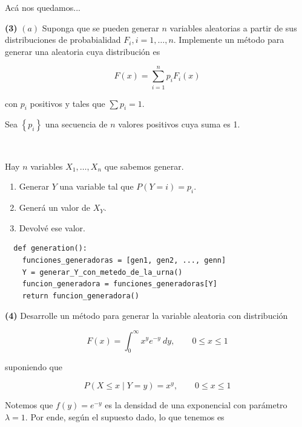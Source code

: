 \documentclass[a4paper, 12pt]{article}
\begin{document}
Acá nos quedamos...

\pagebreal 

\begin{myframe}
  \textbf{(3)} $(a)$ Suponga que se pueden generar $n$ variables aleatorias a
  partir de sus distribuciones de probabialidad $F_i, i=1, \ldots, n$.
  Implemente un método para generar una aleatoria cuya distribución es 

  \begin{equation*}
    F(x) = \sum_{i=1}^n p_iF_i(x)
  \end{equation*}

  con $p_i$ positivos y tales que $\sum p_i = 1$.
\end{myframe}

Sea $\left\{ p_i \right\} $ una secuencia de $n$ valores positivos cuya suma es
1. 

~

Hay $n$ variables $X_1, \ldots, X_n$ que sabemos generar. 

\begin{enumerate}
  \item Generar $Y$ una variable tal que $P(Y = i) = p_i$.
  \item Generá un valor de $X_Y$.
  \item Devolvé ese valor.
\end{enumerate}

\begin{verbatim}
  def generation():
    funciones_generadoras = [gen1, gen2, ..., genn]
    Y = generar_Y_con_metedo_de_la_urna()
    funcion_generadora = funciones_generadoras[Y]
    return funcion_generadora()
\end{verbatim}

\pagebreak 

\begin{myframe}
  \textbf{(4)} Desarrolle un método para generar la variable aleatoria con
  distribución 

  \begin{equation*}
    F(x) = \int_0^\infty x^ye^{-y} ~ dy, \qquad 0\leq x \leq 1
  \end{equation*}

  suponiendo que 

  \begin{equation*}
    P(X \leq x \mid Y = y) = x^y, \qquad 0 \leq x \leq 1
  \end{equation*}
\end{myframe}

Notemos que $f(y) = e^{-y}$ es la densidad de una exponencial con parámetro
$\lambda = 1$. Por ende, según el supuesto dado, lo que tenemos es
\end{document}
